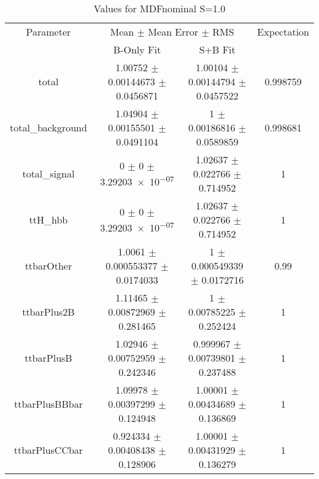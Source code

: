 \begin{table}
\centering
\caption{Values for MDFnominal S=1.0}
\begin{tabular}{cccc}
\toprule
Parameter & \multicolumn{2}{c}{Mean $\pm$ Mean Error $\pm$ RMS} & Expectation\\
 & B-Only Fit & S+B Fit & \\
\midrule
total & \num{1.00752} $\pm$ \num{0.00144673} $\pm$ \num{0.0456871} & \num{1.00104} $\pm$ \num{0.00144794} $\pm$ \num{0.0457522} & \num{0.998759}\\
total\_background & \num{1.04904} $\pm$ \num{0.00155501} $\pm$ \num{0.0491104} & \num{1} $\pm$ \num{0.00186816} $\pm$ \num{0.0589859} & \num{0.998681}\\
total\_signal & \num{0} $\pm$ \num{0} $\pm$ \num{3.29203e-07} & \num{1.02637} $\pm$ \num{0.022766} $\pm$ \num{0.714952} & \num{1}\\
ttH\_hbb & \num{0} $\pm$ \num{0} $\pm$ \num{3.29203e-07} & \num{1.02637} $\pm$ \num{0.022766} $\pm$ \num{0.714952} & \num{1}\\
ttbarOther & \num{1.0061} $\pm$ \num{0.000553377} $\pm$ \num{0.0174033} & \num{1} $\pm$ \num{0.000549339} $\pm$ \num{0.0172716} & \num{0.99}\\
ttbarPlus2B & \num{1.11465} $\pm$ \num{0.00872969} $\pm$ \num{0.281465} & \num{1} $\pm$ \num{0.00785225} $\pm$ \num{0.252424} & \num{1}\\
ttbarPlusB & \num{1.02946} $\pm$ \num{0.00752959} $\pm$ \num{0.242346} & \num{0.999967} $\pm$ \num{0.00739801} $\pm$ \num{0.237488} & \num{1}\\
ttbarPlusBBbar & \num{1.09978} $\pm$ \num{0.00397299} $\pm$ \num{0.124948} & \num{1.00001} $\pm$ \num{0.00434689} $\pm$ \num{0.136869} & \num{1}\\
ttbarPlusCCbar & \num{0.924334} $\pm$ \num{0.00408438} $\pm$ \num{0.128906} & \num{1.00001} $\pm$ \num{0.00431929} $\pm$ \num{0.136279} & \num{1}\\
\bottomrule
\end{tabular}
\end{table}